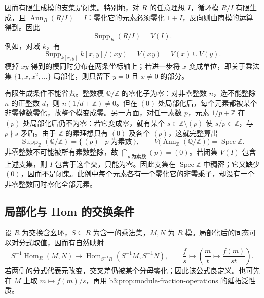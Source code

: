 因而有限生成模的支集是闭集。特别地，对 \(R\) 的任意理想 \(I\)，循环模 \(R/I\) 有限生成，且 \(\operatorname{Ann}_R(R/I)=I\)：零化它的元素必须零化 \(1+I\)，反向则由商模的运算得到。因此
\[
	\operatorname{Supp}_R(R/I)=V(I).
\]
例如，对域 \(k\)，有
\[
	\operatorname{Supp}_{k[x,y]} k[x,y]/(xy)=V(xy)=V(x)\cup V(y).
\]
模掉 \(xy\) 得到的模同时分布在两条坐标轴上；若进一步将 \(x\) 变成单位，即关于乘法集 \(\{1,x,x^2,\ldots\}\) 局部化，则只留下 \(y=0\) 且 \(x\ne0\) 的部分。

\ProseParagraphBreak
有限生成条件不能省去。整数模 \(\mathbb Q/\mathbb Z\) 的零化子为零：对非零整数 \(n\)，选不能整除 \(n\) 的正整数 \(d\)，则 \(n(1/d+\mathbb Z)\ne0\)。但在 \((0)\) 处局部化后，每个元素都被某个非零整数零化，故整个模变成零。另一方面，对任一素数 \(p\)，元素 \(1/p+\mathbb Z\) 在 \((p)\) 处局部化后仍不为零：若它变成零，就有某个 \(s\in\mathbb Z\setminus(p)\) 使 \(s/p\in\mathbb Z\)，与 \(p\nmid s\) 矛盾。由于 \(\mathbb Z\) 的素理想只有 \((0)\) 及各个 \((p)\)，这就完整算出
\[
	\operatorname{Supp}_{\mathbb Z}(\mathbb Q/\mathbb Z) =\{\,(p)\mid p\;\text{为素数}\,\},\qquad V\bigl(\operatorname{Ann}_{\mathbb Z}(\mathbb Q/\mathbb Z)\bigr) =\operatorname{Spec}\mathbb Z.
\]
非零整数不可能被所有素数整除，故 \(\bigcap_{p\;\text{为素数}}(p)=(0)\)。若闭集 \(V(I)\) 包含上述支集，则 \(I\) 包含于这个交，只能为零。因此支集在 \(\operatorname{Spec}\mathbb Z\) 中稠密；它又缺少 \((0)\)，因而不是闭集。此例中每个元素各有一个零化它的非零乘子，却没有一个非零整数同时零化全部元素。

\subsection{局部化与 Hom 的交换条件}
\label{b3:subsec:0203:02}

设 \(R\) 为交换含幺环，\(S\subseteq R\) 为含一的乘法集，\(M,N\) 为 \(R\) 模。局部化后的同态可以对分式取值，因而有自然映射
\begin{equation}\label{b3:eq:hom-localization-map}
	S^{-1}\operatorname{Hom}_R(M,N) \longrightarrow \operatorname{Hom}_{S^{-1}R}(S^{-1}M,S^{-1}N), \qquad \frac fs\longmapsto \left(\frac mt\longmapsto\frac{f(m)}{st}\right).
\end{equation}
若两侧的分式代表元改变，交叉差仍被某个分母零化；因此该公式良定义。也可先在 \(M\) 上取 \(m\mapsto f(m)/s\)，再用\cref{b3:prop:module-fraction-operations}的延拓泛性质。

